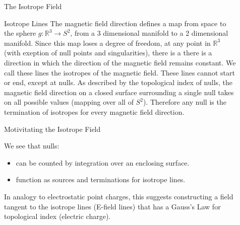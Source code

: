 \documentclass[final]{beamer}
\newlength{\sepwid}
\newlength{\onecolwid}
\begin{document}
\begin{frame}[t]
\begin{columns}[t]
\begin{column}{\onecolwid}

\end{column} %


\begin{column}{\sepwid}\end{column} %

\begin{column}{\onecolwid} %


%

\begin{block}{\huge{The Isotrope Field}}
\begin{block}{Isotrope Lines}
  The magnetic field direction defines a map from space to the sphere $g:\mathbb{R}^3\rightarrow S^2$,
  from a 3 dimensional manifold to a 2 dimensional manifold.
  Since this map loses a degree of freedom,
  at any point in $\mathbb{R}^3$ (with exeption of null points and singularities),
  there is a there is a direction in which the direction
  of the magnetic field remains constant.
  We call these lines the isotropes of the magnetic field.
  These lines cannot start or end, except at nulls.
  As described by the topological index of nulls, the magnetic field direction
  on a closed surface surrounding a single null takes on all possible values (mapping over all of $S^2$).
  Therefore any null is the termination of isotropes for every magnetic field direction.
\end{block}

\begin{block}{Motivitating the Isotrope Field}
  {\Large
  We see that nulls:
  \begin{itemize}
  \item can be counted by integration over an enclosing surface.
  \item function as sources and terminations for isotrope lines.
  \end{itemize}
  In analogy to electrostatic point charges,
  this suggests constructing a field tangent to the isotrope lines (E-field lines)
  that has a Gauss's Law for topological index (electric charge).
  }
\end{block}


\end{block}
\end{column}
\end{columns}
\end{frame}
\end{document}
